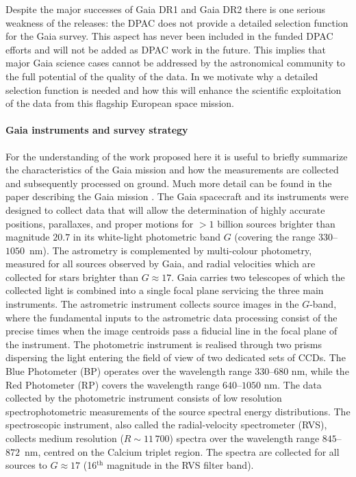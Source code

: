 Despite the major successes of Gaia DR1 and Gaia DR2 there is one serious weakness of the releases: the DPAC does not provide a detailed selection function for the Gaia survey. This aspect has never been included in the funded DPAC efforts and will not be added as DPAC work in the future. This implies that major Gaia science cases cannot be addressed by the astronomical community to the full potential of the quality of the data. In  we motivate why a detailed selection function is needed and how this will enhance the scientific exploitation of the data from this flagship European space mission. 

\paragraph{Gaia instruments and survey strategy} For the understanding of the work proposed here it is useful to briefly summarize the characteristics of the Gaia mission and how the measurements are collected and subsequently processed on ground. Much more detail can be found in the paper describing the Gaia mission \cite{2016A&A...595A...1G}. The Gaia spacecraft and its instruments were designed to collect data that will allow the determination of highly accurate positions, parallaxes, and proper motions for $>1$ billion sources brighter than magnitude $20.7$ in its white-light photometric band $G$ (covering the range $330$--$1050$~nm). The astrometry is complemented by multi-colour photometry, measured for all sources observed by Gaia, and radial velocities which are collected for stars brighter than $G\approx17$. Gaia carries two telescopes of which the collected light is combined into a single focal plane servicing the three main instruments. The astrometric instrument collects source images in the $G$-band, where the fundamental inputs to the astrometric data processing consist of the precise times when the image centroids pass a fiducial line in the focal plane of the instrument. The photometric instrument is realised through two prisms dispersing the light entering the field of view of two dedicated sets of CCDs. The Blue Photometer (BP) operates over the wavelength range $330$--$680$ nm, while the Red Photometer (RP) covers the wavelength range $640$--$1050$ nm. The data collected by the photometric instrument consists of low resolution spectrophotometric measurements of the source spectral energy distributions. The spectroscopic instrument, also called the radial-velocity spectrometer (RVS), collects medium resolution ($R\sim11\,700$) spectra over the wavelength range $845$--$872$~nm, centred on the Calcium triplet region. The spectra are collected for all sources to $G\approx17$ (16$^\text{th}$ magnitude in the RVS filter band).

